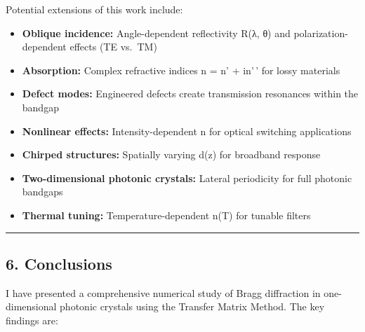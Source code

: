 \documentclass[
]{article}
\providecommand{\tightlist}{%
  \setlength{\itemsep}{0pt}\setlength{\parskip}{0pt}}
\begin{document}
Potential extensions of this work include:

\begin{itemize}
\tightlist
\item
  \textbf{Oblique incidence:} Angle-dependent reflectivity R(λ, θ) and
  polarization-dependent effects (TE vs.~TM)
\item
  \textbf{Absorption:} Complex refractive indices n = n' + in'\,' for
  lossy materials
\item
  \textbf{Defect modes:} Engineered defects create transmission
  resonances within the bandgap
\item
  \textbf{Nonlinear effects:} Intensity-dependent n for optical
  switching applications
\item
  \textbf{Chirped structures:} Spatially varying d(z) for broadband
  response
\item
  \textbf{Two-dimensional photonic crystals:} Lateral periodicity for
  full photonic bandgaps
\item
  \textbf{Thermal tuning:} Temperature-dependent n(T) for tunable
  filters
\end{itemize}

\begin{center}\rule{0.5\linewidth}{0.5pt}\end{center}

\subsection{6. Conclusions}\label{conclusions}

I have presented a comprehensive numerical study of Bragg diffraction in
one-dimensional photonic crystals using the Transfer Matrix Method. The
key findings are:
\end{document}
